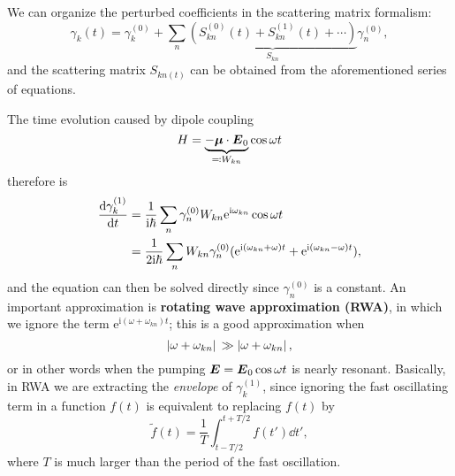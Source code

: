 \documentclass[hyperref, a4paper]{article}
\newcommand*{\ii}{\mathrm{i}}
\newcommand*{\ee}{\mathrm{e}}
\newcommand*{\concept}[1]{{\textbf{#1}}}
\begin{document}
We can organize the perturbed coefficients in the scattering matrix formalism:
\begin{equation}
    \gamma_k(t) = \gamma_k^{(0)} + \sum_n \underbrace{(S_{kn}^{(0)}(t) + S_{kn}^{(1)}(t) + \cdots)}_{S_{kn}} \gamma_n^{(0)},
\end{equation}
and the scattering matrix $S_{kn(t)}$ can be obtained from the 
aforementioned series of equations.

The time evolution caused by dipole coupling 
\begin{equation}
    H = \underbrace{
        - \vb*{\mu} \cdot \vb*{E}_0
    }_{ \eqqcolon W_{kn}} \cos \omega t
\end{equation}
therefore is 
\begin{equation}
    \begin{aligned}
        \dv{\gamma_k^{(1)}}{t} &= \frac{1}{\ii \hbar} 
        \sum_n \gamma^{(0)}_n W_{kn} \ee^{\ii \omega_{kn}} \cos \omega t  \\
        &= \frac{1}{2 \ii \hbar} \sum_n 
        W_{kn} \gamma_n^{(0)} (
            \ee^{\ii (\omega_{kn} + \omega) t} 
            + \ee^{\ii (\omega_{kn} - \omega) t }
        ),
    \end{aligned}
\end{equation}
and the equation can then be solved directly 
since $\gamma_n^{(0)}$ is a constant.
An important approximation is 
\concept{rotating wave approximation (RWA)},
in which we ignore the term $\ee^{\ii (\omega + \omega_{kn}) t}$;
this is a good approximation
when 
\begin{equation}
    \abs*{\omega + \omega_{kn}} \gg \abs*{\omega + \omega_{kn}},
\end{equation}
or in other words when 
the pumping $\vb*{E} = \vb*{E}_0 \cos \omega t$ 
is nearly resonant.
Basically, in RWA we are extracting the \emph{envelope} 
of $\gamma_k^{(1)}$, 
since ignoring the fast oscillating term in a function $f(t)$
is equivalent to replacing $f(t)$ by 
\begin{equation}
    \tilde{f}(t) = \frac{1}{T} \int_{t - T/2}^{t + T/2} f(t') \dd{t'},
\end{equation}
where $T$ is much larger than the period of the fast oscillation.
\end{document}
